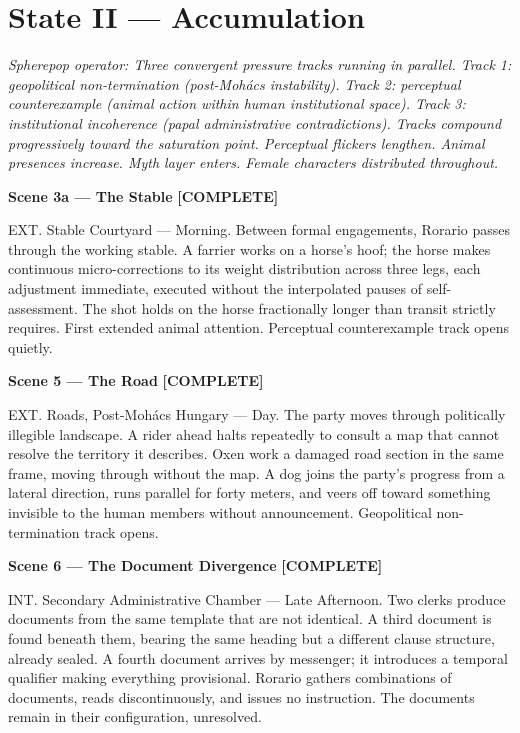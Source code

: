 \documentclass[12pt, oneside]{amsart}
\newcommand{\statuscomplete}{{\small\bfseries\color{complete}[COMPLETE]}}
\begin{document}
\section{State II — Accumulation}

\noindent\textit{Spherepop operator: Three convergent pressure tracks running in parallel. Track 1: geopolitical non-termination (post-Moh\'acs instability). Track 2: perceptual counterexample (animal action within human institutional space). Track 3: institutional incoherence (papal administrative contradictions). Tracks compound progressively toward the saturation point. Perceptual flickers lengthen. Animal presences increase. Myth layer enters. Female characters distributed throughout.}

\bigskip

\noindent\textbf{Scene 3a --- The Stable} \statuscomplete

\noindent EXT. Stable Courtyard --- Morning. Between formal engagements, Rorario passes through the working stable. A farrier works on a horse's hoof; the horse makes continuous micro-corrections to its weight distribution across three legs, each adjustment immediate, executed without the interpolated pauses of self-assessment. The shot holds on the horse fractionally longer than transit strictly requires. First extended animal attention. Perceptual counterexample track opens quietly.

\bigskip

\noindent\textbf{Scene 5 --- The Road} \statuscomplete

\noindent EXT. Roads, Post-Moh\'acs Hungary --- Day. The party moves through politically illegible landscape. A rider ahead halts repeatedly to consult a map that cannot resolve the territory it describes. Oxen work a damaged road section in the same frame, moving through without the map. A dog joins the party's progress from a lateral direction, runs parallel for forty meters, and veers off toward something invisible to the human members without announcement. Geopolitical non-termination track opens.

\bigskip

\noindent\textbf{Scene 6 --- The Document Divergence} \statuscomplete

\noindent INT. Secondary Administrative Chamber --- Late Afternoon. Two clerks produce documents from the same template that are not identical. A third document is found beneath them, bearing the same heading but a different clause structure, already sealed. A fourth document arrives by messenger; it introduces a temporal qualifier making everything provisional. Rorario gathers combinations of documents, reads discontinuously, and issues no instruction. The documents remain in their configuration, unresolved.
\end{document}
